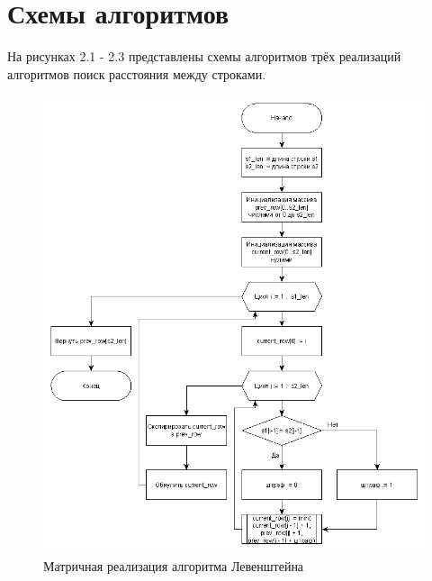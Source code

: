 \documentclass[12pt, a4paper]{report}
\begin{document}
	\section{Схемы алгоритмов}
	На рисунках 2.1 - 2.3 представлены схемы алгоритмов трёх реализаций алгоритмов поиск расстояния между строками.
	\begin{figure}[ht!]
		\centering
		\includegraphics[scale=0.5]{leven}
		\caption{Матричная реализация алгоритма Левенштейна}
		\label{fig:leven}
	\end{figure}
\end{document}
